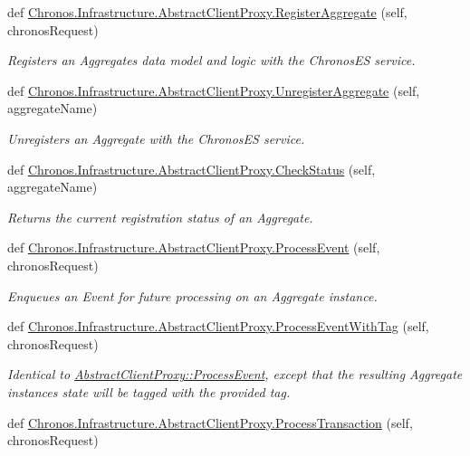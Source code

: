 \begin{DoxyCompactItemize}
def \hyperlink{group__Chronos_ga9db2d08d508fec263a1ac0ab32f35270}{Chronos.\+Infrastructure.\+Abstract\+Client\+Proxy.\+Register\+Aggregate} (self, chronos\+Request)
\begin{DoxyCompactList}\small\item\em Registers an Aggregate\textquotesingle{}s data model and logic with the Chronos\+ES service. \end{DoxyCompactList}\item 
def \hyperlink{group__Chronos_ga14714722b17498ad6577150842e8913a}{Chronos.\+Infrastructure.\+Abstract\+Client\+Proxy.\+Unregister\+Aggregate} (self, aggregate\+Name)
\begin{DoxyCompactList}\small\item\em Unregisters an Aggregate with the Chronos\+ES service. \end{DoxyCompactList}\item 
def \hyperlink{group__Chronos_ga8637a20ab0e90916d8d59b43900a5c30}{Chronos.\+Infrastructure.\+Abstract\+Client\+Proxy.\+Check\+Status} (self, aggregate\+Name)
\begin{DoxyCompactList}\small\item\em Returns the current registration status of an Aggregate. \end{DoxyCompactList}\item 
def \hyperlink{group__Chronos_gacc2169d49a6cf3a6947b6362adce3669}{Chronos.\+Infrastructure.\+Abstract\+Client\+Proxy.\+Process\+Event} (self, chronos\+Request)
\begin{DoxyCompactList}\small\item\em Enqueues an Event for future processing on an Aggregate instance. \end{DoxyCompactList}\item 
def \hyperlink{group__Chronos_ga5111d259b3175c8ce60ebb40ce99cdb6}{Chronos.\+Infrastructure.\+Abstract\+Client\+Proxy.\+Process\+Event\+With\+Tag} (self, chronos\+Request)
\begin{DoxyCompactList}\small\item\em Identical to \hyperlink{group__Chronos_gacc2169d49a6cf3a6947b6362adce3669}{Abstract\+Client\+Proxy\+::\+Process\+Event}, except that the resulting Aggregate instance\textquotesingle{}s state will be tagged with the provided tag. \end{DoxyCompactList}\item 
def \hyperlink{group__Chronos_ga008afdc8115dff35614c7d68a40fb411}{Chronos.\+Infrastructure.\+Abstract\+Client\+Proxy.\+Process\+Transaction} (self, chronos\+Request)

\end{DoxyCompactItemize}
